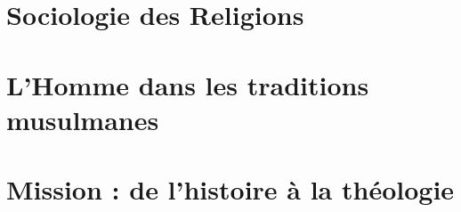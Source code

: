 \documentclass[oneside,10pt]{book}
\begin{document}
 







\setcounter{page}{1}
 



%
%

% 
%
%
%

%
%

% 
 
 
 
 
  
 \part{Sociologie des Religions}
 
 
  
 
 
 
  
  
 
  \part{L'Homme dans les traditions musulmanes}
 
 
 
 
    
   
 
 \part{Mission : de l'histoire à la théologie}
 
 
  
 
 
 
  
  
  
 
% 
 
\end{document}
